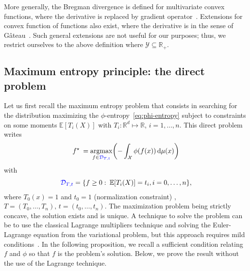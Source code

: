 \documentclass[entropy,article,submit,moreauthors,pdftex]{Definitions/mdpi}
\newcommand{\SZ}[1]{{\color{blue} #1}}                                       %
\def\dmu{\mathrm{d}\mu}%
\def\Rset{\mathbb{R}}%
\def\X{\mathcal{X}}%
\def\Y{\mathcal{Y}}%
\def\D{\mathcal{D}}%
\DeclareMathOperator*{\argmax}{\operatorname{argmax}}%
\newcommand{\Esp}[1]{\mathbb{E}\left[ #1 \right]}%
\begin{document}
More  generally,  the Bregman  divergence  is  defined for  multivariate  convex
functions,     where    the     derivative    is     replaced    by     gradient
operator~\cite{Bre67}. Extensions  for convex function of  functions also exist,
where the derivative  is in the sense of  G\^ateau~\cite{NieNoc17}. Such general
extensions are not  useful for our purposes; thus, we  restrict ourselves to the
above definition where $\Y \subseteq \Rset_+$.




\subsection{Maximum entropy principle: the direct problem}
\label{subsec:MaxPhiEntDirect}

Let us first  recall the maximum entropy problem that  consists in searching for
the distribution maximizing the $\phi$-entropy~\eqref{eq:phi-entropy} subject to
constraints on  some moments $\Esp{T_i(X)}$  with $T_i: \Rset^d  \mapsto \Rset$,
$i=1,\ldots,n$. This direct problem writes
%
\begin{equation}\label{eq:MaxEnt}
\displaystyle f^\star \: = \argmax_{f \in \SZ{\D_{T,t}}} \left( - \int_\X \phi(f(x)) \,
\dmu(x) \right)
\end{equation}
%
with
%
\begin{equation}\label{eq:Ct}
\SZ{\D_{T,t}} = \left\{ f \ge 0: \: \Esp{T_i(X)} = t_i, i=0,\ldots,n\right\},
\end{equation}
%
where $T_0(x)  = 1$ and  $t_0 = 1$ (normalization  constraint)\SZ{, $T =  (T_0 ,
  \ldots , T_n), \, t = (t_0 , \ldots , t_n)$}.  The maximization problem being
strictly concave,  the solution exists and  is unique. A technique  to solve the
problem  can be  to use  the  classical Lagrange  multipliers technique  \SZ{and
  solving the  Euler-Lagrange equation from  the variational problem},  but this
approach   requires  mild   conditions~\cite{KesKap89,  BorLew91:03,   BorLew93,
  BenBor92,  TebVaj93,  Gir97}.   In  the following  proposition,  we  recall  a
sufficient  condition relating  $f$  and $\phi$  so that  $f$  is the  problem's
solution. Below, we prove the result without the use of the Lagrange technique.
\end{document}

